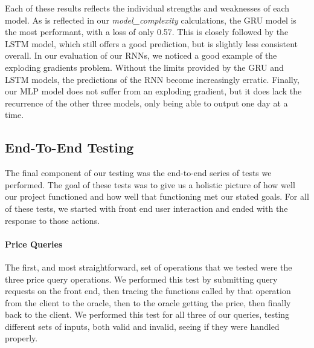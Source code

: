 \documentclass{article}
\begin{document}
    Each of these results reflects the individual strengths and weaknesses of each model.  As is reflected in our
    \textit{model\_complexity} calculations, the GRU model is the most performant, with a loss of only 0.57.  This is
    closely followed by the LSTM model, which still offers a good prediction, but is slightly less consistent overall.
    In our evaluation of our RNNs, we noticed a good example of the exploding gradients problem.  Without the limits
    provided by the GRU and LSTM models, the predictions of the RNN become increasingly erratic.  Finally, our
    MLP model does not suffer from an exploding gradient, but it does lack the recurrence of the other three models,
    only being able to output one day at a time.

    \subsection{End-To-End Testing}

    The final component of our testing was the end-to-end series of tests we performed.  The goal of these tests was to
    give us a holistic picture of how well our project functioned and how well that functioning met our stated goals.
    For all of these tests, we started with front end user interaction and ended with the response to those actions.

    \paragraph{Price Queries}
    The first, and most straightforward, set of operations that we tested were the three price query operations.
    We performed this test by submitting query requests on the front end, then tracing the functions called by that operation
    from the client to the oracle, then to the oracle getting the price, then finally back to the client.  We performed
    this test for all three of our queries, testing different sets of inputs, both valid and invalid, seeing if they
    were handled properly.
\end{document}
